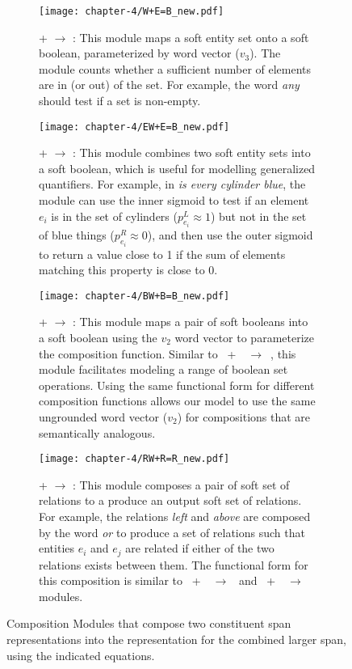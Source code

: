 \begin{figure}[h!]
   \smallskip

  \begin{subfigure}[t]{.48\textwidth}
    \centering
    \texttt{[image: chapter-4/W+E=B\_new.pdf]}
    \caption{\label{fig:web}\scriptsize{ +  $\rightarrow$ : This module maps a soft entity set onto a soft boolean, parameterized by word vector ($v_{3}$).  The module counts whether a sufficient number of elements are in (or out) of the set. For example, the word \emph{any} should test if a set is non-empty.}}
  \end{subfigure}
  \hfill
  \begin{subfigure}[t]{.48\textwidth}
    \centering
    \texttt{[image: chapter-4/EW+E=B\_new.pdf]}
    \caption{\label{fig:eweb}\scriptsize{ +  $\rightarrow$ : This module combines two soft entity sets into a soft boolean, which is useful for     modelling generalized quantifiers. For example, in \emph{is every cylinder blue}, the module can use the inner sigmoid to test if an element $e_i$ is in the set of cylinders ($p^{L}_{e_{i}}\approx 1$) but not in the set of blue things ($p^{R}_{e_{i}}\approx 0$), and then use the outer sigmoid to return a value close to 1 if the sum of elements matching this property is close to 0.  }}
  \end{subfigure}

   \smallskip

  \begin{subfigure}[t]{.48\textwidth}
    \centering
    \texttt{[image: chapter-4/BW+B=B\_new.pdf]}
    \caption{\label{fig:bwbb}\scriptsize{ +  $\rightarrow$ : This module maps a pair of soft booleans into a soft boolean using the $v_{2}$ word vector to parameterize the composition function. Similar to ~+~~$\rightarrow$~, this module facilitates modeling a range of boolean set operations. Using the same functional form for different composition functions allows our model to use the same ungrounded word vector ($v_{2}$) for compositions that are semantically analogous.}}
  \end{subfigure}
  \hfill
  \begin{subfigure}[t]{.48\textwidth}
    \centering
    \texttt{[image: chapter-4/RW+R=R\_new.pdf]}
    \caption{\label{fig:rwrr}\scriptsize{ +  $\rightarrow$ : This module composes a pair of soft set of relations to a produce an output soft set of relations. For example, the relations \emph{left} and \emph{above} are composed by the word \emph{or} to produce a set of relations such that entities $e_{i}$ and $e_{j}$ are related if either of the two relations exists between them. The functional form for this composition is similar to ~+~~$\rightarrow$~ and ~+~~$\rightarrow$~ modules. }}
  \end{subfigure}

  \caption{\label{fig:04-modules} \footnotesize{Composition Modules that compose two constituent span representations into the representation for the combined larger span, using the indicated equations.}}
\end{figure}
